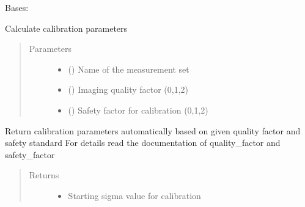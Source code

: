 \documentclass[letterpaper,10pt,english]{sphinxmanual}
\begin{document}
\begin{fulllineitems}
\label{\detokenize{paircars:paircars.basic_func.CalcParams}}
\sphinxAtStartPar
Bases: 

\sphinxAtStartPar
Calculate calibration parameters
\begin{quote}\begin{description}
\item[{Parameters}] \leavevmode\begin{itemize}
\item {} 
\sphinxAtStartPar
{} () \textendash{} Name of the measurement set

\item {} 
\sphinxAtStartPar
{} () \textendash{} Imaging quality factor (0,1,2)

\item {} 
\sphinxAtStartPar
{} () \textendash{} Safety factor for calibration (0,1,2)

\end{itemize}

\end{description}\end{quote}

\begin{fulllineitems}
\label{\detokenize{paircars:paircars.basic_func.CalcParams.calc_calibration_params}}
\sphinxAtStartPar
Return calibration parameters automatically based on given quality factor and safety standard
For details read the documentation of quality\_factor and safety\_factor
\begin{quote}\begin{description}
\item[{Returns}] \leavevmode
\sphinxAtStartPar
\begin{itemize}
\item {} 
\sphinxAtStartPar
{} \textendash{} Starting sigma value for calibration


\end{itemize}
\end{description}
\end{quote}
\end{fulllineitems}
\end{fulllineitems}
\end{document}

